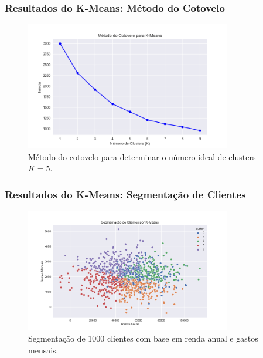 \documentclass{beamer}
\begin{document}
\begin{frame}
    \frametitle{Resultados do K-Means: Método do Cotovelo}
    \begin{figure}
        \includegraphics[width=0.8\textwidth]{imagens/elbow_method.png}
        \caption{Método do cotovelo para determinar o número ideal de clusters \( K = 5 \).}
    \end{figure}

\end{frame}

\begin{frame}
    \frametitle{Resultados do K-Means: Segmentação de Clientes}
    \begin{figure}
        \includegraphics[width=0.8\textwidth]{imagens/customer_segmentation.png}
        \caption{Segmentação de 1000 clientes com base em renda anual e gastos mensais.}
    \end{figure}
\end{frame}
\end{document}
